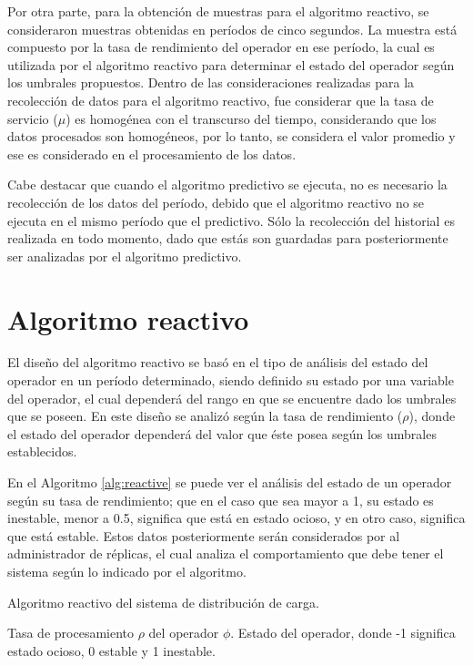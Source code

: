 Por otra parte, para la obtención de muestras para el algoritmo reactivo, se consideraron muestras obtenidas en períodos de cinco segundos. La muestra está compuesto por la tasa de rendimiento del operador en ese período, la cual es utilizada por el algoritmo reactivo para determinar el estado del operador según los umbrales propuestos. Dentro de las consideraciones realizadas para la recolección de datos para el algoritmo reactivo, fue considerar que la tasa de servicio ($\mu$) es homogénea con el transcurso del tiempo, considerando que los datos procesados son homogéneos, por lo tanto, se considera el valor promedio y ese es considerado en el procesamiento de los datos. 

Cabe destacar que cuando el algoritmo predictivo se ejecuta, no es necesario la recolección de los datos del período, debido que el algoritmo reactivo no se ejecuta en el mismo período que el predictivo. Sólo la recolección del historial es realizada en todo momento, dado que estás son guardadas para posteriormente ser analizadas por el algoritmo predictivo.

\section{Algoritmo reactivo}
El diseño del algoritmo reactivo se basó en el tipo de análisis del estado del operador en un período determinado, siendo definido su estado por una variable del operador, el cual dependerá del rango en que se encuentre dado los umbrales que se poseen. En este diseño se analizó según la tasa de rendimiento ($\rho$), donde el estado del operador dependerá del valor que éste posea según los umbrales establecidos.

En el Algoritmo \ref{alg:reactive} se puede ver el análisis del estado de un operador según su tasa de rendimiento; que en el caso que sea mayor a 1, su estado es inestable, menor a 0.5, significa que está en estado ocioso, y en otro caso, significa que está estable. Estos datos posteriormente serán considerados por al administrador de réplicas, el cual analiza el comportamiento que debe tener el sistema según lo indicado por el algoritmo.

\begin{algorithm}[!ht]
	\caption{Algoritmo reactivo del sistema de distribución de carga.}
	\label{alg:reactive}
	\begin{algorithmic}[1]
	\REQUIRE Tasa de procesamiento $\rho$ del operador $\phi$.
	\ENSURE Estado del operador, donde -1 significa estado ocioso, 0 estable y 1 inestable.
	\ELSE
	\ENDIF
	\end{algorithmic}
\end{algorithm}


